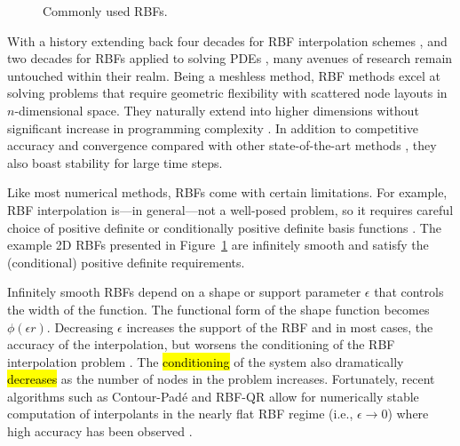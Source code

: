 \begin{figure}[ht]
    \centering
    \caption{Commonly used RBFs.}
    \label{fig:rbfs}
\end{figure}

With a history extending back four decades for RBF interpolation schemes \cite{Hardy1971}, and two decades for RBFs applied to solving PDEs \cite{Kansa1990a}, many avenues of research remain untouched within their realm. Being a meshless method, RBF methods excel at solving problems that require geometric flexibility with scattered node layouts in $n$-dimensional space. They naturally extend into higher dimensions without significant increase in programming complexity \cite{FlyerWright07,WrightFlyerYuen10}. In addition to competitive accuracy and convergence compared with other state-of-the-art methods \cite{FlyerWright07, FlyerWright09, FlyerLehto10, WrightFlyerYuen10, FlyerFornberg11}, they also boast stability for large time steps.

Like most numerical methods, RBFs come with certain
limitations. For example, RBF interpolation is---in general---not a well-posed
problem, so it requires careful choice of positive definite or conditionally
positive definite basis functions \cite{Iske2004,Fasshauer2007}. 
The example 2D RBFs presented in Figure~\ref{fig:rbfs} are infinitely smooth and satisfy the (conditional) positive definite requirements. 

Infinitely smooth RBFs depend on a shape or support parameter $\epsilon$ that controls the width of the function. The functional form of the shape function becomes $\phi(\epsilon r)$. Decreasing $\epsilon$ increases the support of the RBF and in most cases, the accuracy of the interpolation, but worsens the conditioning of the RBF interpolation problem \cite{Schaback1995}. The \hl{conditioning} of the system also dramatically \hl{decreases} as the number of nodes in the problem increases. Fortunately, recent algorithms such as Contour-Pad\'{e} \cite{Fornberg2004} and RBF-QR \cite{Fornberg2007, Fornberg2011a} allow for numerically stable computation of interpolants in the nearly flat RBF regime (i.e., $\epsilon \rightarrow 0$) where high accuracy has been observed \cite{Larsson2003, Fornberg2008}.


